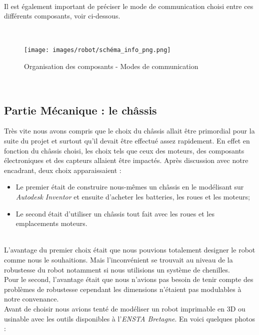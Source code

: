 \documentclass[french]{rapportENSTAB}
\begin{document}
\\

Il est également important de préciser le mode de communication choisi entre ces différents composants, voir ci-dessous.

\\

 
 \begin{figure}[H]
    \centering
    \texttt{[image: images/robot/schéma\_info\_png.png]}
    \caption{Organisation des composants - Modes de communication}
    \label{fig:cdcf}
\end{figure}

\\

\subsection{Partie Mécanique : le châssis}
Très vite nous avons compris que le choix du châssis allait être primordial pour la suite du projet et surtout qu'il devait être effectué assez rapidement. En effet en fonction du châssis choisi, les choix tels que ceux des moteurs, des composants électroniques et des capteurs allaient être impactés. Après discussion avec notre encadrant, deux choix apparaissaient : \begin{itemize}[label=\textbullet, font=\small\color{blue}]
    \item Le premier était de construire nous-mêmes un châssis en le modélisant sur \textit{Autodesk Inventor} et ensuite d'acheter les batteries, les roues et les moteurs;
    \item Le second était d'utiliser un châssis tout fait avec les roues et les emplacements moteurs.
\end{itemize}\\

L’avantage du premier choix était que nous pouvions totalement designer le robot comme nous le souhaitions. Mais l’inconvénient se trouvait au niveau de la robustesse du robot notamment si nous utilisions un système de chenilles. \\

Pour le second, l'avantage était que nous n’avions pas besoin de tenir compte des problèmes de robustesse cependant les dimensions n'étaient pas modulables à notre convenance. \\

Avant de choisir nous avions tenté de modéliser un robot imprimable en 3D ou usinable avec les outils disponibles à l'\textit{ENSTA Bretagne}. En voici quelques photos :
\end{document}
